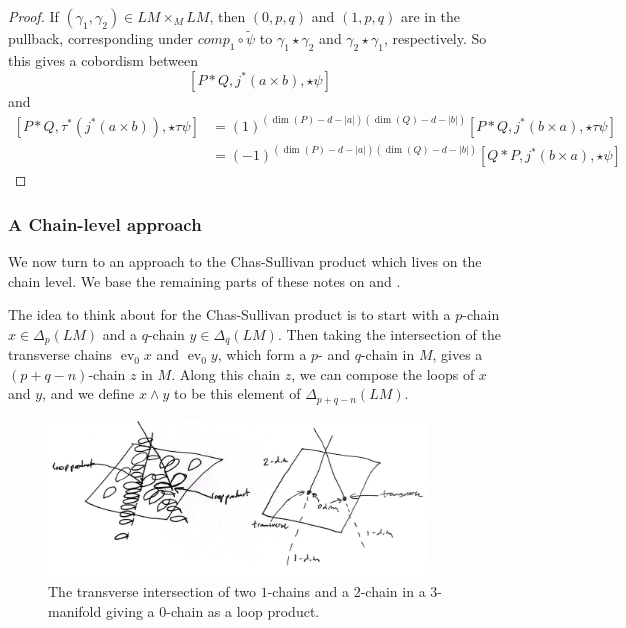 \documentclass[reqno]{amsart}
\theoremstyle{definition}
\theoremstyle{remark}
\DeclareMathOperator{\ev}{ev}
\begin{document}
\begin{proof}
    If $\left( \gamma_1, \gamma_2 \right) \in 
    LM \times_M LM$, then
    $\left( 0,p,q \right)$ and
    $ \left( 1, p,q \right) $ are in the pullback,
    corresponding under 
    $comp_1 \circ \tilde{\psi} $ to
    $\gamma_1 \star \gamma_2$ and $ \gamma_2 \star \gamma_1$, respectively.
    So this gives a cobordism between
    \[
    \left[ P * Q, j^{*}(a \times b), \star \psi \right]
    \] 
    and
    \begin{align*}
    \left[ P * Q, \tau^{*}\left( j^{*}(a \times b) \right) ,
    \star \tau \psi\right] 
    &= (1)^{\left( \dim(P) - d - \left| a \right|  \right) 
    \left( \dim (Q) - d - \left| b \right|  \right) } 
    \left[ P * Q , j^{*}(b \times a), \star \tau \psi \right] \\
    &=
    (-1)^{\left( \dim(P) - d- \left| a \right| \right)
    \left( \dim (Q) - d- \left| b \right|  \right) }
    \left[ Q* P, j^{*}(b \times a), \star \psi \right] 
    \end{align*}
    
\end{proof}



    






\subsubsection{A Chain-level approach}
We now turn to an approach to the Chas-Sullivan product which lives on the
chain level. We base the remaining parts of these notes on
\cite{Naef-Rivera-Wahl} and \cite{Hingston-Wahl}.\\
\linebreak



The idea to think about for the Chas-Sullivan product is to
start with a $p$-chain $x \in \Delta_p (LM)$ and a 
$q$-chain $y \in \Delta_q (LM)$.
Then taking the intersection of the transverse chains
$\ev_0 x$ and $\ev_0 y$, which form a $p$- and $q$-chain in $M$,
gives a $(p+q-n)$-chain $z$ in $M$.
Along this chain $z$, we can compose the loops of $x$ and $y$, and
we define $x \wedge y$ to be this element of
$\Delta_{p+q-n}(LM)$.


\begin{figure}[htpb]
    \centering
    \includegraphics[width=0.9\textwidth]{Figures/DNOVXJ.jpeg}
    \caption{The transverse intersection of two $1$-chains and
    a $2$-chain in a $3$-manifold giving a $0$-chain as a 
loop product. \cite[From Figure 2]{Chas-Sullivan}}
    \label{fig:Figures-DNOVXJ-jpeg}
\end{figure}
\end{document}
